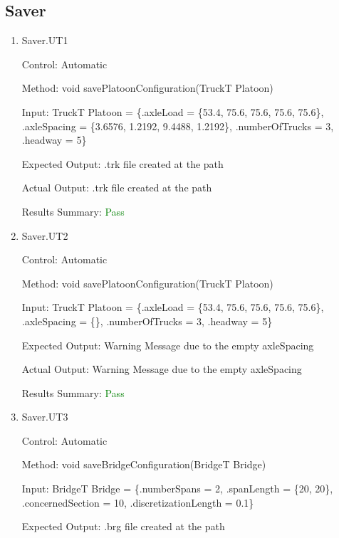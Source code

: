 \documentclass[12pt, titlepage]{article}
\begin{document}
\subsection{Saver}
\begin{enumerate}
    \item{Saver.UT1\\}
    
    Control: Automatic
    
    Method:  void savePlatoonConfiguration(TruckT Platoon)
    
    Input: TruckT Platoon = \{.axleLoad = \{53.4, 75.6, 75.6, 75.6, 75.6\},
                        .axleSpacing = \{3.6576, 1.2192, 9.4488, 1.2192\},
                        .numberOfTrucks = 3,
                        .headway = 5\}
    
    Expected Output: .trk file created at the path 

    Actual Output: .trk file created at the path

    Results Summary: \textcolor{green} {Pass}

    \item{Saver.UT2\\}
    
    Control: Automatic
    
    Method:  void savePlatoonConfiguration(TruckT Platoon)
    
    Input: TruckT Platoon = \{.axleLoad = \{53.4, 75.6, 75.6, 75.6, 75.6\},
                        .axleSpacing = \{\},
                        .numberOfTrucks = 3,
                        .headway = 5\}
    
    Expected Output: Warning Message due to the empty axleSpacing

    Actual Output: Warning Message due to the empty axleSpacing

    Results Summary: \textcolor{green} {Pass}

    \item{Saver.UT3\\}
    
    Control: Automatic
    
    Method:  void saveBridgeConfiguration(BridgeT Bridge)
    
    Input: BridgeT Bridge = \{.numberSpans = 2,
                         .spanLength = \{20, 20\},
                         .concernedSection = 10,
                         .discretizationLength = 0.1\}
    
    Expected Output: .brg file created at the path


\end{enumerate}
\end{document}
